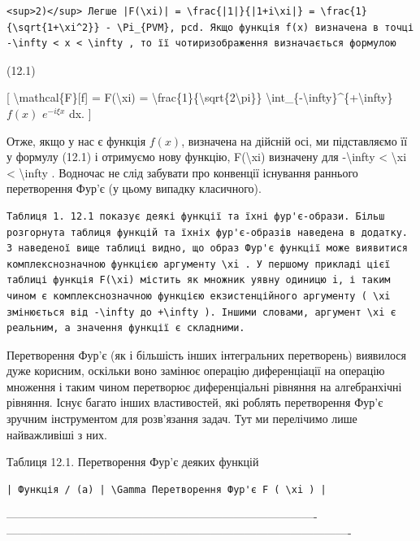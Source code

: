 \documentclass[
]{article}
\begin{document}
{{\begin{verbatim}
<sup>2)</sup> Легше |F(\xi)| = \frac{|1|}{|1+i\xi|} = \frac{1}{\sqrt{1+\xi^2}} - \Pi_{PVM}, pcd. Якщо функція f(x) визначена в точці -\infty < x < \infty , то її чотиризображення визначається формулою
\end{verbatim}

(12.1)

{[} \textbackslash mathcal\{F\}{[}f{]} = F(\textbackslash xi) =
\textbackslash frac\{1\}\{\textbackslash sqrt\{2\textbackslash pi\}\}
\textbackslash int\_\{-\textbackslash infty\}\^{}\{+\textbackslash infty\}
\(f(x)\) \(e^{-i\xi x}\) dx. {]}

Отже, якщо у нас є функція \(f(x)\), визначена на дійсній осі, ми
підставляємо її у формулу (12.1) і отримуємо нову функцію,
F(\textbackslash xi) визначену для -\textbackslash infty \textless{}
\textbackslash xi \textless{} \textbackslash infty . Водночас не слід
забувати про конвенції існування раннього перетворення Фур'є (у цьому
випадку класичного).

\begin{verbatim}
Таблиця 1. 12.1 показує деякі функції та їхні фур'є-образи. Більш розгорнута таблиця функцій та їхніх фур'є-образів наведена в додатку. З наведеної вище таблиці видно, що образ Фур'є функції може виявитися комплекснозначною функцією аргументу \xi . У першому прикладі цієї таблиці функція F(\xi) містить як множник уявну одиницю i, і таким чином є комплекснозначною функцією екзистенційного аргументу ( \xi змінюється від -\infty до +\infty ). Іншими словами, аргумент \xi є реальним, а значення функції є складними.
\end{verbatim}

Перетворення Фур'є (як і більшість інших інтегральних перетворень)
виявилося дуже корисним, оскільки воно замінює операцію диференціації на
операцію множення і таким чином перетворює диференціальні рівняння на
алгебранхічні рівняння. Існує багато інших властивостей, які роблять
перетворення Фур'є зручним інструментом для розв'язання задач. Тут ми
перелічимо лише найважливіші з них.

Таблиця 12.1. Перетворення Фур'є деяких функцій

\begin{verbatim}
| Функція / (a) | \Gamma Перетворення Фур'є F ( \xi ) |
\end{verbatim}

\textbar----------------------------------------------------------------------------------\textbar-------------------------------------------------------------------------------------------\textbar{}

}}
\end{document}
